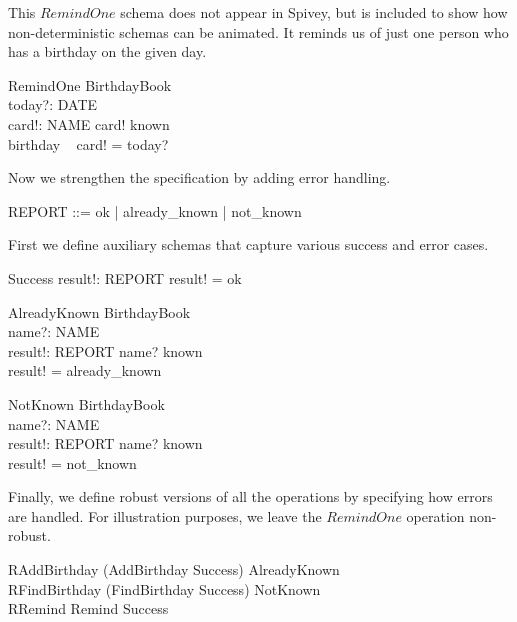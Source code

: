 \documentclass{article}
\begin{document}
This $RemindOne$ schema does not appear in Spivey, but is
included to show how non-deterministic schemas can be animated.
It reminds us of just one person who has a birthday on the given 
day.
\begin{schema}{RemindOne}
    \Xi BirthdayBook \\
    today?: DATE \\
    card!: NAME
\where
    card! \in known \\
    birthday ~ card! = today?
\end{schema}


Now we strengthen the specification by adding error handling.

\begin{zed} 
    REPORT ::= ok | already\_known | not\_known
\end{zed}

First we define auxiliary schemas that capture various success
and error cases.

\begin{schema}{Success}
    result!: REPORT
\where
    result! = ok
\end{schema}

\begin{schema}{AlreadyKnown}
    \Xi BirthdayBook \\
    name?: NAME \\
    result!: REPORT
\where
    name? \in known \\
    result! = already\_known
\end{schema}


\begin{schema}{NotKnown}
    \Xi BirthdayBook \\
    name?: NAME \\
    result!: REPORT
\where
    name? \notin known \\
    result! = not\_known
\end{schema}

Finally, we define robust versions of all the operations
by specifying how errors are handled.  
For illustration purposes, we leave the $RemindOne$ operation non-robust.

\begin{zed} 
    RAddBirthday  (AddBirthday \land Success) \lor AlreadyKnown \\
    RFindBirthday  (FindBirthday \land Success) \lor NotKnown \\
    RRemind  Remind \land Success
\end{zed}
\end{document}
